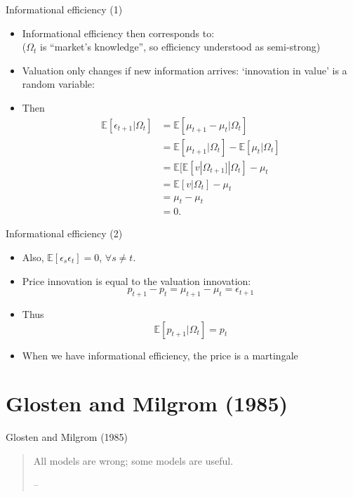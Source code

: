 \documentclass[english,10pt
,aspectratio=169
]{beamer}
\begin{document}
\begin{frame}{Informational efficiency (1)}
\begin{itemize}
	\item Informational efficiency then corresponds to: 
	\\
	($\Omega_t$ is ``market's knowledge'', so efficiency understood as semi-strong)
	\item Valuation only changes if new information arrives: `innovation in value' is a random variable: 
	\item Then
	\begin{align*}
		\mathbb{E}[\epsilon_{t+1}|\Omega_t] 
		& = \mathbb{E}[\mu_{t+1} - \mu_t|\Omega_t]\\
		& = \mathbb{E}[\mu_{t+1}|\Omega_t] - \mathbb{E}[\mu_t|\Omega_t]\\  
		& = \mathbb{E}[ \mathbb{E}[v|\Omega_{t+1}]|\Omega_t] - \mu_t\\  
		& = \mathbb{E}[v|\Omega_t] - \mu_t\\  
		& = \mu_t- \mu_t\\  
		& = 0.
	\end{align*}
\end{itemize}
\end{frame}


\begin{frame}{Informational efficiency (2)}
	\begin{itemize}
	 \item Also, $\mathbb{E}[\epsilon_{s}\epsilon_t]=0$, $\forall s \ne t$.
	\item Price innovation is equal to the valuation innovation:
	\[
	p_{t+1} - p_t = \mu_{t+1} - \mu_t = \epsilon_{t+1}
	\]
	\item Thus
	\[
	\mathbb{E}[p_{t+1}|\Omega_{t}] = p_t
	\]
	\item When we have informational efficiency, the price is a \alert{martingale}
\end{itemize}
\end{frame}



\section{Glosten and Milgrom (1985)}

\begin{frame}{Glosten and Milgrom (1985)}
	\begin{quotation}
		All models are wrong; some models are useful.
		\begin{flushright}
			-- 
		\end{flushright}
	\end{quotation}
\end{frame}
\end{document}
